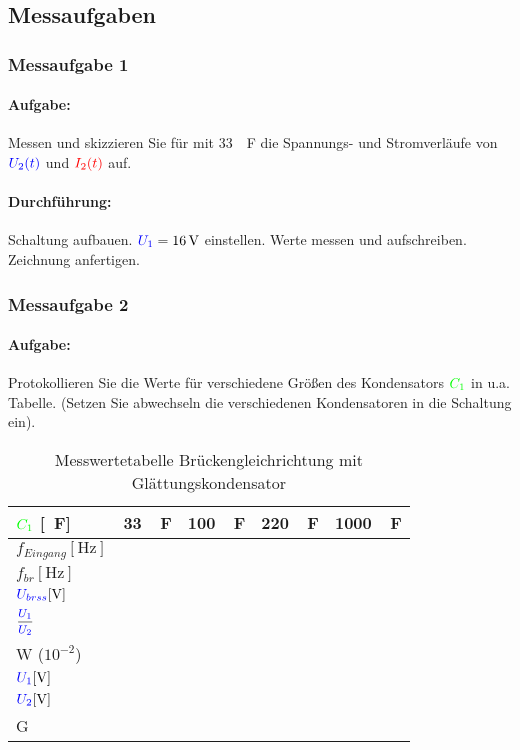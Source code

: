 \documentclass[11pt,a4paper,titlepage,parskip=half]{scrreprt}
\begin{document}
			\subsection{Messaufgaben}
			\subsubsection{Messaufgabe 1}
			\paragraph{Aufgabe:}   Messen und skizzieren Sie für  mit \SI{33}{\mu\farad} die Spannungs- und Stromverläufe von $\textcolor{blue}{U_2(t)}$ und $\textcolor{red}{I_2(t)}$ auf.
			\paragraph{Durchführung:}  Schaltung aufbauen. $\textcolor{blue}{U_1} = \SI{16}{\volt}$ einstellen. Werte messen und aufschreiben. Zeichnung anfertigen.

			\subsubsection{Messaufgabe 2}
			\paragraph{Aufgabe:}  Protokollieren Sie die Werte für verschiedene Größen des Kondensators $\textcolor{green}{C_1}$ in u.a. Tabelle. (Setzen Sie abwechseln die verschiedenen Kondensatoren in die Schaltung ein). 
            
    			\begin{table}[H]
    				\caption{Messwertetabelle Brückengleichrichtung mit Glättungskondensator}
    				\label{tbl:messergebnisse2.2}
    				\renewcommand{\arraystretch}{1.6}
                    \begin{center}
    				\begin{tabular}{l|c|c|c|c}
    					$\textcolor{green}{C_1}$ [\si{\mu\farad}] & \SI{33}{\mu\farad} &\SI{100}{\mu\farad} &\SI{220}{\mu\farad} &\SI{1000}{\mu\farad}\\ \hline
    					$f_{Eingang} [\si{\hertz}]$  &  &  &  & \\\hline
    					$f_{br} [\si{\hertz}]$ &  &  &  & \\\hline
    					$\textcolor{blue}{U_{brss}} [\si{\volt}]$ &  &  &  &   \\\hline
    					$\mfrac{\spannung{U_1}}{\spannung{U_2}}$ &  &  &  & \\\hline
    					W ($10^{-2}$) & &  &  &  \\\hline
    					$\textcolor{blue}{U_1} [\si{\volt}]$ &  &  &  & \\\hline
                        $\textcolor{blue}{U_2} [\si{\volt}]$ &  &  &  & \\\hline
                        G &	 &  &  & 
    				\end{tabular}
                \end{center}
    			\end{table}
            
\end{document}
